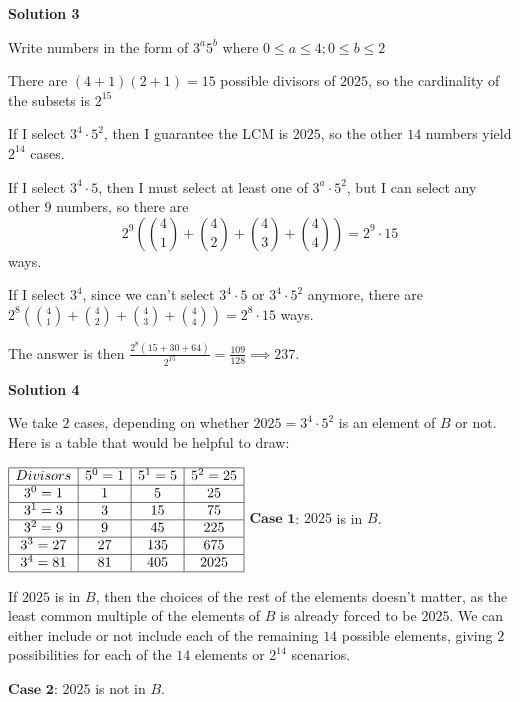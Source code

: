 \begin{enumerate}
\textbf{Solution 3}

Write numbers in the form of $3^{a}5^{b}$ where $0\leq a\leq 4; 0\leq b\leq 2$

 There are $(4+1)(2+1)=15$ possible divisors of $2025$, so the cardinality of the subsets is $2^{15}$

 If I select $3^4\cdot 5^2$, then I guarantee the LCM is $2025$, so the other $14$ numbers yield $2^{14}$ cases.

 If I select $3^4\cdot 5$, then I must select at least one of $3^a\cdot5^2$, but I can select any other $9$ numbers, so there are 
 \[2^9 \left(\binom{4}{1}+\binom{4}{2}+\binom{4}{3}+\binom{4}{4} \right)=2^9\cdot 15\] ways.

 If I select $3^4$, since we can't select $3^4\cdot 5$ or $3^4\cdot5^2$ anymore, there are $2^8 \left(\binom{4}{1}+\binom{4}{2}+\binom{4}{3}+\binom{4}{4} \right)=2^8\cdot 15$ ways.

 The answer is then $\frac{2^8(15+30+64)}{2^{15}}=\frac{109}{128}\implies \boxed{237}$.

 



\textbf{Solution 4}

We take $2$ cases, depending on whether $2025=3^4\cdot5^2$ is an element of $B$ or not. Here is a table that would be helpful to draw:

 
$\begin{array}{|c|c|c|c|} \hline Divisors  & 5^0=1  & 5^1=5  & 5^2=25  \\ \hline 3^0=1  & 1  & 5  & 25  \\ \hline 3^1=3  & 3 & 15 & 75 \\ \hline 3^2=9 & 9 & 45 & 225 \\ \hline 3^3=27 & 27 & 135 & 675 \\ \hline 3^4=81 & 81 & 405 & 2025 \\ \hline \end{array}$
$\textbf{Case 1}$: $2025$ is in $B$.

 If $2025$ is in $B$, then the choices of the rest of the elements doesn't matter, as the least common multiple of the elements of $B$ is already forced to be $2025$. We can either include or not include each of the remaining $14$ possible elements, giving $2$ possibilities for each of the $14$ elements or $2^{14}$ scenarios.

 
$\textbf{Case 2}$: $2025$ is not in $B$.


\end{enumerate}
